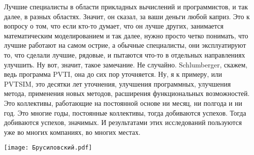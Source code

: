 \documentclass[main.tex]{subfiles}
\begin{document}
Лучшие специалисты в области прикладных вычислений и программистов, и так далее, в разных областях.
Значит, он сказал, за ваши деньги любой каприз.
Это к вопросу о том, что если кто-то думает, что он лучше других, занимается математическим моделированием и так далее, нужно просто четко понимать, что лучшие работают на самом острие, а обычные специалисты, они эксплуатируют то, что сделали лучшие, рядовые, и пытаются что-то в отдельных направлениях улучшить.
Ну вот, значит, такое замечание.
Не случайно.
Schlumberger, скажем, ведь программа PVTI, она до сих пор уточняется.
Ну, я к примеру, или PVTSIM, это десятки лет уточнения, улучшения программных, улучшения метода, применения новых методов, расширения функциональных возможностей.
Это коллективы, работающие на постоянной основе ни месяц, ни полгода и ни год.
Это многие годы, постоянные коллективы, тогда добиваются успехов.
Тогда добиваются успехов, значимых.
И результатами этих исследований пользуются уже во многих компаниях, во многих местах.

\begin{center}
\texttt{[image: Брусиловский.pdf]}
\end{center}
\end{document}
